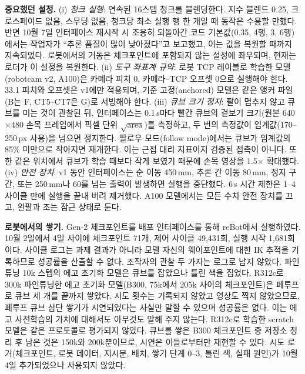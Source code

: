 \documentclass[conference,10pt]{IEEEtran}
\newcommand{\mm}{\,mm\xspace}
\begin{document}
\textbf{중요했던 설정.} (i) \emph{청크 실행}: 연속된 16스텝 청크를 블렌딩한다. 지수 블렌드 0.25, 크로스페이드 없음, 스무딩 없음,
청크당 최소 실행 행 한 개일 때 동작은 수용할 만했다. 반면 10월 7일 인터페이스 재시작 시 조용히 되돌아간 코드 기본값(0.35, 4행,
3\textdegree, 6행)에서는 작업자가 ``추론 품질이 많이 낮아졌다''고 보고했고, 이는 값을 복원할 때까지 지속되었다. 로봇에서의 거동은
체크포인트에 포함되지 않는 설정에 좌우되며, 현재는 로더가 이 설정을 복원한다. (ii) \emph{도구 좌표계 규약}: 로봇 TCP 레이블로 학습한
모델(robotcam v2, A100)은 카메라 피치 0, 카메라--TCP 오프셋 0으로 실행해야 한다. 33.1\textdegree{} 피치와 오프셋은 v1에만 적용되며,
기준 고정(anchored) 모델은 같은 앵커 파일(B는 F, CT5--CT7은 G)로 서빙해야 한다. (iii) \emph{큐브 크기 정지}: 팔이 멈추지 않고 큐브를
미는 것이 관찰된 뒤, 인터페이스는 0.1\,s마다 빨간 큐브의 겉보기 크기(원본 640$\times$480 손목 프레임에서 픽셀 단위
$\sqrt{\text{area}}$)를 측정하고, 두 번의 측정값이 임계값(170--250\,px 사용)을 넘으면 정지한다. 팔로우 모드(follow mode)에서는 큐브가
임계값의 85\% 미만으로 작아지면 재개한다. 이는 근접 대리 지표이지 검증된 접촉이 아니다. 또한 같은 위치에서 큐브가 학습 때보다 작게
보였기 때문에 손목 영상을 1.5$\times$ 확대했다. (iv) \emph{안전 장치}: v1 동안 인터페이스는 순 이동 450\mm, 추론 간 이동 80\mm, 정지
구간, 또는 250\mm{}나 60\textdegree{}를 넘는 출력이 발생하면 실행을 중단했다. 6\,s 시간 제한은 1--4 사이클 만에 실행을 끝내 버려
제거했다. A100 모델에서는 모든 수치 안전 장치를 끄고, 왼팔과 조는 잠근 상태로 둔다.

\textbf{로봇에서의 쌓기.} Gen-2 체크포인트를 배포 인터페이스를 통해 reBot에서 실행하였다. 10월 2일에서 4일 사이에 체크포인트 71개,
제어 사이클 49{,}431회, 실행 시작 1{,}681회이다. 사이클 로그는 과제 결과가 아니라 모델 자신의 웨이포인트에 대한 IK 추적을 기록하므로
성공률을 산출할 수 없다. 조작자의 관찰 두 가지는 로그로 남지 않았다. 파인튜닝 10k 스텝의 에고 초기화 모델은 큐브를 잡았으나 틀린 색을
집었다. R312c로 300k 파인튜닝한 에고 초기화 모델(B300, 75k에서 205k 사이의 체크포인트)은 폐루프로 큐브 세 개를 끝까지 쌓았다. 시도
횟수는 기록되지 않았고 영상도 찍지 않았으므로, 폐루프 큐브 삼단 쌓기가 시연되었다는 사실만 말할 수 있으며 성공률은 없다. 이는 에고
사전학습의 가치에 대해서도 아무것도 말해 주지 않는다. R312c로 학습한 scratch 모델은 같은 프로토콜로 평가되지 않았다. 큐브를 쌓은
B300 체크포인트 중 저장소 정리 후 남은 것은 150k와 200k뿐이므로, 시연은 이들로부터만 재현할 수 있다. 시도 로거(체크포인트, 로봇
데이터, 지시문, 배치, 쌓기 단계 0--3, 틀린 색, 실패 원인)가 10월 4일 추가되었으나 사용되지 않았다.
\end{document}
